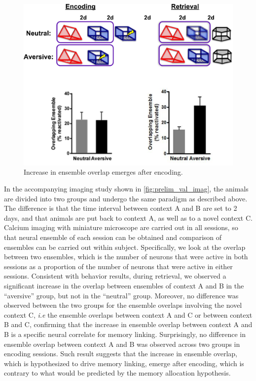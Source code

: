 \documentclass[master.tex]{subfiles}
\begin{document}

\begin{figure}[!h]
  \centering \includegraphics[scale = .15]{Figures/val_retro_prelim_imag.pdf}
  \caption{\footnotesize Increase in ensemble overlap emerges after encoding.}
  \label{fig:prelim_val_imag}
\end{figure}

In the accompanying imaging study shown in \autoref{fig:prelim_val_imag}, the
animals are divided into two groups and undergo the same paradigm as described
above. The difference is that the time interval between context A and B are set
to 2 days, and that animals are put back to context A, as well as to a novel
context C. Calcium imaging with miniature microscope are carried out in all
sessions, so that neural ensemble of each session can be obtained and comparison
of ensembles can be carried out within subject. Specifically, we look at the
overlap between two ensembles, which is the number of neurons that were active
in both sessions as a proportion of the number of neurons that were active in
either sessions. Consistent with behavior results, during retrieval, we observed
a significant increase in the overlap between ensembles of context A and B in
the ``aversive'' group, but not in the ``neutral'' group. Moreover, no
difference was observed between the two groups for the ensemble overlaps
involving the novel context C, \textit{i.e} the ensemble overlaps between
context A and C or between context B and C, confirming that the increase in
ensemble overlap between context A and B is a specific neural correlate for
memory linking. Surprisingly, no difference in ensemble overlap between context
A and B was observed across two groups in encoding sessions. Such result
suggests that the increase in ensemble overlap, which is hypothesized to drive
memory linking, emerge after encoding, which is contrary to what would be
predicted by the memory allocation hypothesis.
\end{document}
